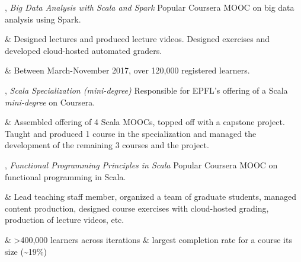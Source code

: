 \documentclass[9pt]{article}
\begin{document}
\medskip
{}

, {\em Big Data Analysis with Scala and Spark} 
\newline\noindent Popular Coursera MOOC on big data analysis using Spark. 
\smallskip
\begin{easylist}[itemize]
& Designed lectures and produced lecture videos. Designed exercises
\newline and developed cloud-hosted automated graders.

& Between March-November 2017, over 120,000 registered learners.
\end{easylist}

%
\bigskip



, {\em Scala Specialization (mini-degree)} 
\newline\noindent Responsible for EPFL's offering of a Scala {\em mini-degree} on Coursera. 
\smallskip
\begin{easylist}[itemize]
& Assembled offering of 4 Scala MOOCs, topped off with a capstone
\newline project. Taught and produced 1 course in the specialization and
\newline managed the development of the remaining 3 courses and the project.
\end{easylist}
\bigskip


, {\em Functional Programming Principles in Scala} 
\newline\noindent Popular Coursera MOOC on functional programming in Scala. 
\smallskip
\begin{easylist}[itemize]
& Lead teaching staff member, organized a team of graduate
\newline students, managed content production, designed course exercises
\newline with cloud-hosted grading, production of lecture videos, etc.

& >400,000 learners across iterations \& largest completion
\newline rate for a course its size (\textasciitilde19\%)
\end{easylist}
\bigskip
\end{document}
